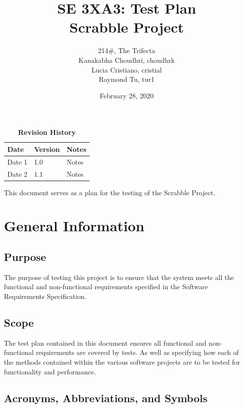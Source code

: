 \documentclass[12pt, titlepage]{article}
\title{SE 3XA3: Test Plan\\Scrabble Project}
\author{214\#, The Trifecta
		\\ Kanakabha Choudhri, choudhrk
		\\ Lucia Cristiano, cristial
		\\ Raymond Tu, tur1
}
\date{February 28, 2020}
\begin{document}
\maketitle

\tableofcontents
\listoftables
\listoffigures

\begin{table}[bp]
\caption{\bf Revision History}
\begin{tabularx}{\textwidth}{p{3cm}p{2cm}X}
\toprule {\bf Date} & {\bf Version} & {\bf Notes}\\
\midrule
Date 1 & 1.0 & Notes\\
Date 2 & 1.1 & Notes\\
\bottomrule
\end{tabularx}
\end{table}

\newpage


This document serves as a plan for the testing of the Scrabble Project.

\section{General Information} 

\subsection{Purpose}

The purpose of testing this project is to ensure that the system meets all the functional and non-functional requirements specified in the Software Requirements Specification.

\subsection{Scope}

The test plan contained in this document ensures all  functional and non-functional requirements are covered by tests. As well as specifying how each of the methods contained within the various software projects are to be tested for functionality and performance.

\subsection{Acronyms, Abbreviations, and Symbols}
	
\end{document}
